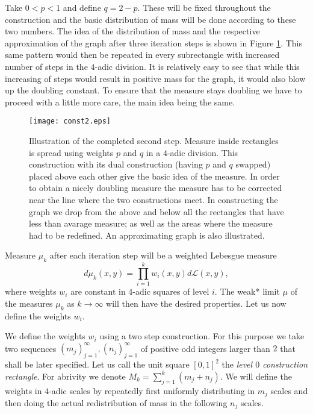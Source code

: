 \documentclass[reqno,12pt]{amsart}
\theoremstyle{plain}
\theoremstyle{remark}
\begin{document}
  Take $0 < p<1$ and define $q = 2-p$. These will be fixed throughout the construction and 
  the basic distribution of mass will be done according to these two numbers. The idea of the distribution of mass
  and the respective approximation of the graph after three iteration steps is shown in 
  Figure \ref{fig:const1}. This same pattern would then be repeated in every subrectangle with increased number of steps
  in the $4$-adic division. It is relatively 
  easy to see that while this increasing of steps would result in positive mass for the
  graph, it would also blow up the doubling constant. To ensure that the measure stays
  doubling we have to proceed with a little more care, the main idea being the same.
  \begin{figure}
    \centering
     \texttt{[image: const2.eps]}
     \caption{Illustration of the completed second step. Measure inside rectangles is spread using weights $p$ and $q$ in a $4$-adic division.
             This construction with its dual construction (having $p$ and $q$ swapped) placed above each other give the basic idea of the measure.
             In order to obtain a nicely doubling measure the measure has to be corrected near the line where the two constructions meet.
             In constructing the graph we drop from the above and below all the rectangles that have less than avarage measure;
             as well as the areas where the measure had to be redefined. An approximating graph is also illustrated.}
    \label{fig:const1}
  \end{figure}

  Measure $\mu_k$ after each iteration step will be a weighted 
  Lebesgue measure
  \[
   d\mu_k(x,y) = \prod_{i=1}^k w_i(x,y) d{\ensuremath{\mathcal{L}}}(x,y),
  \]
  where weights $w_i$ are constant in $4$-adic squares of level $i$.
  The weak* limit $\mu$ of the measures $\mu_k$ as $k \to \infty$ will then have the desired properties. Let us now define the weights $w_i$.

  We define the weights $w_i$ using a two step construction. For this purpose we take two sequences $(m_j)_{j = 1}^\infty,
  (n_j)_{j = 1}^\infty$ of positive odd integers larger than $2$ that shall be later specified. Let us call the unit square $[0,1]^2$ the 
  \emph{level $0$ construction rectangle}. For abrivity we denote $M_k = \sum_{j=1}^k(m_j+n_j)$.
  We will define the weights in $4$-adic scales by repeatedly first uniformly distributing in $m_j$ scales and then doing the
  actual redistribution of mass in the following $n_j$ scales.
  
\end{document}
